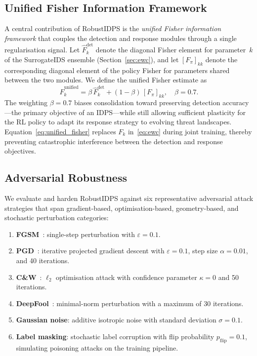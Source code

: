 \documentclass[journal,twoside]{IEEEtran}
\begin{document}
\subsection{Unified Fisher Information Framework}
\label{sec:unified_fisher}

A central contribution of RobustIDPS is the \emph{unified Fisher
information framework} that couples the detection and response modules
through a single regularisation signal.  Let $\hat{F}_k^{\mathrm{det}}$
denote the diagonal Fisher element for parameter~$k$ of the
SurrogateIDS ensemble (Section~\ref{sec:ewc}), and let
$[F_\pi]_{kk}$ denote the corresponding diagonal element of
the policy Fisher for parameters shared between the two modules.  We
define the unified Fisher estimate as
\begin{equation}
  \hat{F}_k^{\mathrm{unified}}
  = \beta\,\hat{F}_k^{\mathrm{det}}
    + (1-\beta)\,[F_\pi]_{kk},
  \quad \beta=0.7.
  \label{eq:unified_fisher}
\end{equation}
The weighting $\beta=0.7$ biases consolidation toward preserving
detection accuracy---the primary objective of an IDPS---while still
allowing sufficient plasticity for the RL policy to adapt its response
strategy to evolving threat landscapes.  Equation~\eqref{eq:unified_fisher}
replaces $F_k$ in~\eqref{eq:ewc} during joint training, thereby
preventing catastrophic interference between the detection and response
objectives.

\subsection{Adversarial Robustness}
\label{sec:adversarial}

We evaluate and harden RobustIDPS against six representative
adversarial attack strategies that span gradient-based, optimisation-based,
geometry-based, and stochastic perturbation categories:
\begin{enumerate}
  \item \textbf{FGSM}~\cite{goodfellow2015explaining}: single-step
    perturbation with $\varepsilon=0.1$.
  \item \textbf{PGD}~\cite{madry2018towards}: iterative projected
    gradient descent with $\varepsilon=0.1$, step size $\alpha=0.01$,
    and 40 iterations.
  \item \textbf{C\&W}~\cite{carlini2017towards}: $\ell_2$ optimisation
    attack with confidence parameter $\kappa=0$ and 50 iterations.
  \item \textbf{DeepFool}~\cite{moosavi2016deepfool}: minimal-norm
    perturbation with a maximum of 30 iterations.
  \item \textbf{Gaussian noise}: additive isotropic noise with standard
    deviation $\sigma=0.1$.
  \item \textbf{Label masking}: stochastic label corruption with flip
    probability $p_{\mathrm{flip}}=0.1$, simulating poisoning attacks on
    the training pipeline.
\end{enumerate}
\end{document}
